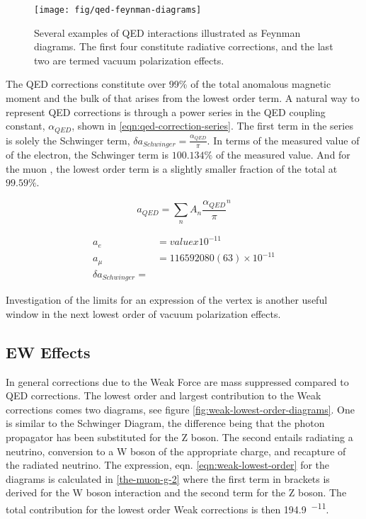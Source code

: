 \begin{figure}
\label{fig:qed-feynman-diagrams}
\texttt{[image: fig/qed-feynman-diagrams]}
\caption{Several examples of QED interactions illustrated as Feynman diagrams.  The first four constitute radiative corrections, and the last two are termed vacuum polarization effects. }
\end{figure}

The QED corrections constitute over 99\% of the total anomalous magnetic moment and the bulk of that arises from the lowest order term.  A natural way to represent QED corrections is through a power series in the QED coupling constant, $\alpha_{QED}$, shown in \ref{eqn:qed-correction-series}.  The first term in the series is solely the Schwinger term, $\delta a_{Schwinger} = \frac{\alpha_{QED}}{\pi}$.  In terms of the measured value of \gmtwo of the electron, the Schwinger term is $100.134\%$ of the measured value. And for the muon \gmtwo, the lowest order term is a slightly smaller fraction of the total at $99.59\%$.

\begin{equation}
\label{eqn:qed-correction-series}
a_{QED} = \sum_n{A_n\frac{\alpha_{QED}}{\pi}^n}
\end{equation}

\begin{align*}
a_{e} & = value x 10^{-11} \\
a_{\mu} & = 11 659 2080(63) \times 10^{-11} \\
\delta a_{Schwinger} = 
\end{align*}

Investigation of the limits for an expression of the vertex is another useful window in the next lowest order of vacuum polarization effects.  

\subsection{EW Effects} \label{sec:theory-ew}

In general corrections due to the Weak Force are mass suppressed compared to QED corrections.  The lowest order and largest contribution to the Weak corrections comes two diagrams, see figure \ref{fig:weak-lowest-order-diagrams}. One is similar to the Schwinger Diagram, the difference being that the photon propagator has been substituted for the Z boson.  The second entails radiating  a neutrino, conversion to a W boson of the appropriate charge, and recapture of the radiated neutrino.  The expression, eqn. \ref{eqn:weak-lowest-order} for the diagrams is calculated in \ref{the-muon-g-2} where the first term in brackets is derived for the W boson interaction and the second term for the Z boson.  The total contribution for the lowest order Weak corrections is then \SI{194.9}{^{-11}}.

